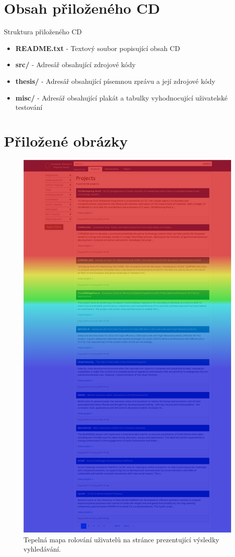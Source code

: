 \chapter{Obsah přiloženého CD}
Struktura přiloženého CD
\begin{itemize}
\item \textbf{README.txt} - Textový soubor popisující obsah CD
\item \textbf{src/} - Adresář obsahující zdrojové kódy
\item \textbf{thesis/} - Adresář obsahující písemnou zprávu a její zdrojové kódy
\item \textbf{misc/} - Adresář obsahující plakát a tabulky vyhodnocující uživatelské testování
\end{itemize}

\chapter{Přiložené obrázky}
\begin{figure}[p]
	\centering
	\includegraphics[height=\textheight-1cm]{obrazky-figures/heatmap-scroll.png}
	\caption{Tepelná mapa rolování uživatelů na stránce prezentující výsledky vyhledávání.}
    \label{img:heatmap-scroll}
\end{figure}